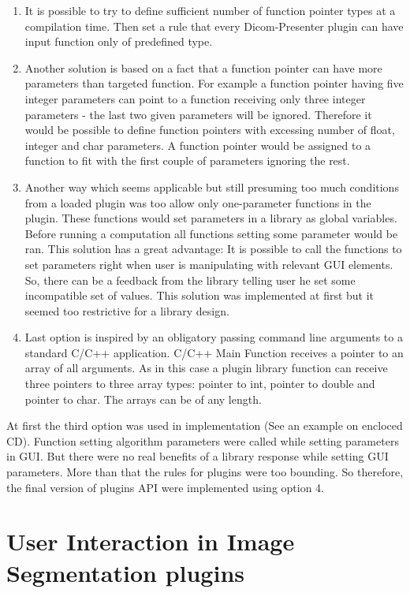 \begin{enumerate}
\item It is possible to try to define sufficient number of function pointer types at a compilation time. Then set a rule that every Dicom-Presenter plugin can have input function only of predefined type.
\item Another solution is based on a fact that a function pointer can have more parameters than targeted function. For example a function pointer having five integer parameters can point to a function receiving only three integer parameters - the last two given parameters will be ignored. Therefore it would be possible to define function pointers with excessing number of float, integer and char parameters. A function pointer would be assigned to a function to fit with the first couple of parameters ignoring the rest.
\item Another way which seems applicable but still presuming too much conditions from a loaded plugin was too allow only one-parameter functions in the plugin. These functions would set parameters in a library as global variables. Before running a computation all functions setting some parameter would be ran. This solution has a great advantage: It is possible to call the functions to set parameters right when user is manipulating with relevant GUI elements. So, there can be a feedback from the library telling user he set some incompatible set of values. This solution was implemented at first but it seemed too restrictive for a library design. 
\item Last option is inspired by an obligatory passing command line arguments to a standard C/C++ application. C/C++ Main Function receives a pointer to an array of all arguments. As in this case a plugin library function can receive three pointers to three array types: pointer to int, pointer to double and pointer to char. The arrays can be of any length.
\end{enumerate}

At first the third option was used in implementation (See an example on encloced CD). Function setting algorithm parameters were called while setting parameters in GUI. But there were no real benefits of a library response while setting GUI parameters. More than that the rules for plugins were too bounding. So therefore, the final version of plugins API were implemented using option 4.

\section{User Interaction in Image Segmentation plugins}

